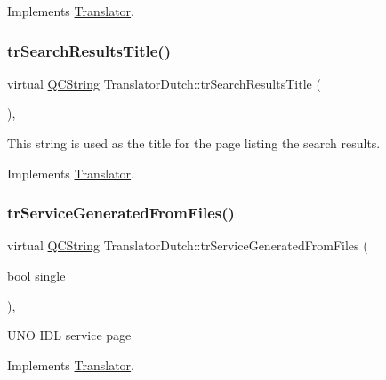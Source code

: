 Implements \mbox{\hyperlink{class_translator}{Translator}}.

\mbox{\label{class_translator_dutch_ace1774a60788aebb5da411cfd75d665c}} 
\subsubsection{\texorpdfstring{trSearchResultsTitle()}{trSearchResultsTitle()}}
{\footnotesize\ttfamily virtual \mbox{\hyperlink{class_q_c_string}{Q\+C\+String}} Translator\+Dutch\+::tr\+Search\+Results\+Title (\begin{DoxyParamCaption}{ }\end{DoxyParamCaption})\hspace{0.3cm}{\ttfamily [inline]}, {\ttfamily [virtual]}}

This string is used as the title for the page listing the search results. 

Implements \mbox{\hyperlink{class_translator}{Translator}}.

\mbox{\label{class_translator_dutch_abd41ae03077770f8bb06bb3b992a14b9}} 
\subsubsection{\texorpdfstring{trServiceGeneratedFromFiles()}{trServiceGeneratedFromFiles()}}
{\footnotesize\ttfamily virtual \mbox{\hyperlink{class_q_c_string}{Q\+C\+String}} Translator\+Dutch\+::tr\+Service\+Generated\+From\+Files (\begin{DoxyParamCaption}\item[{bool}]{single }\end{DoxyParamCaption})\hspace{0.3cm}{\ttfamily [inline]}, {\ttfamily [virtual]}}

U\+NO I\+DL service page 

Implements \mbox{\hyperlink{class_translator}{Translator}}.

\mbox{\label{class_translator_dutch_a1bcfc1d890998de0b2d3aa572a7d9cea}} 
